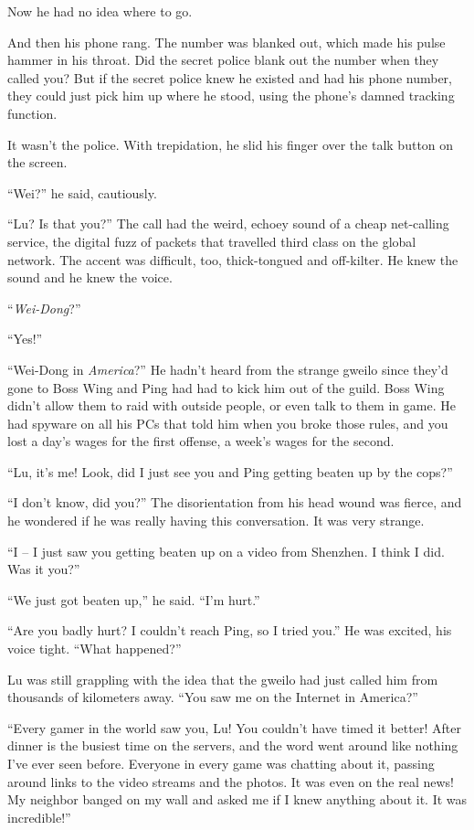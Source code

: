 Now he had no idea where to go.

And then his phone rang. The number was blanked out, which made his
pulse hammer in his throat. Did the secret police blank out the
number when they called you? But if the secret police knew he
existed and had his phone number, they could just pick him up where
he stood, using the phone's damned tracking function.

It wasn't the police. With trepidation, he slid his finger over the
talk button on the screen.

``Wei?'' he said, cautiously.

``Lu? Is that you?'' The call had the weird, echoey sound of a cheap
net-calling service, the digital fuzz of packets that travelled
third class on the global network. The accent was difficult, too,
thick-tongued and off-kilter. He knew the sound and he knew the
voice.

``\emph{Wei-Dong}?''

``Yes!''

``Wei-Dong in \emph{America}?'' He hadn't heard from the strange
gweilo since they'd gone to Boss Wing and Ping had had to kick him
out of the guild. Boss Wing didn't allow them to raid with outside
people, or even talk to them in game. He had spyware on all his PCs
that told him when you broke those rules, and you lost a day's
wages for the first offense, a week's wages for the second.

``Lu, it's me! Look, did I just see you and Ping getting beaten up
by the cops?''

``I don't know, did you?'' The disorientation from his head wound was
fierce, and he wondered if he was really having this conversation.
It was very strange.

``I -- I just saw you getting beaten up on a video from Shenzhen. I
think I did. Was it you?''

``We just got beaten up,'' he said. ``I'm hurt.''

``Are you badly hurt? I couldn't reach Ping, so I tried you.'' He was
excited, his voice tight. ``What happened?''

Lu was still grappling with the idea that the gweilo had just
called him from thousands of kilometers away. ``You saw me on the
Internet in America?''

``Every gamer in the world saw you, Lu! You couldn't have timed it
better! After dinner is the busiest time on the servers, and the
word went around like nothing I've ever seen before. Everyone in
every game was chatting about it, passing around links to the video
streams and the photos. It was even on the real news! My neighbor
banged on my wall and asked me if I knew anything about it. It was
incredible!''

